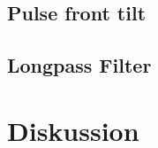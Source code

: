 \documentclass[twoside,        %
               BCOR12mm,       %
               english,ngerman, %
               fleqn,headsepline=false,footsepline=false
              ]{Vorlage/MFPREPORT}
\begin{document}
\subsection{Pulse front tilt}
\subsection{Longpass Filter}
\section{Diskussion}
\cite{tidecks1990current}



\end{document}
